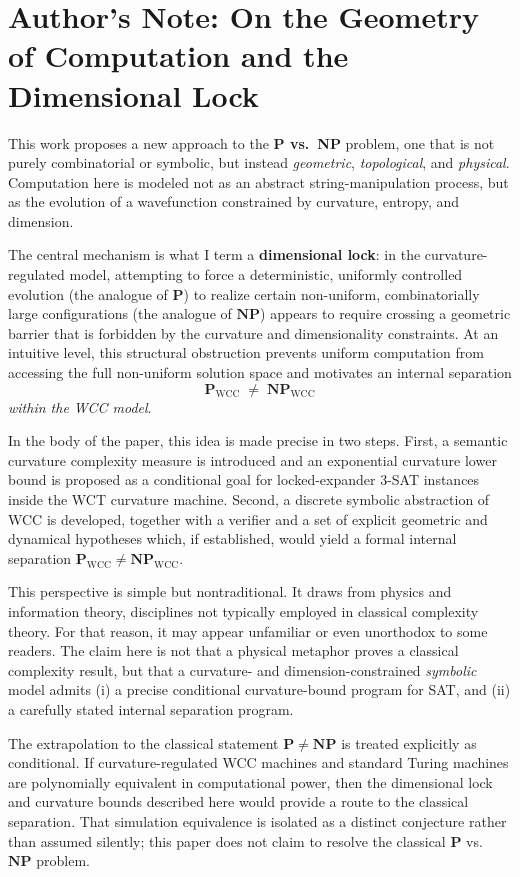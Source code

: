 \documentclass[12pt]{article}
\theoremstyle{remark}
\begin{document}
\clearpage
\section*{Author's Note: On the Geometry of Computation and the Dimensional Lock}

This work proposes a new approach to the \textbf{P vs.\ NP} problem, one that
is not purely combinatorial or symbolic, but instead \emph{geometric},
\emph{topological}, and \emph{physical}. Computation here is modeled not as an
abstract string-manipulation process, but as the evolution of a wavefunction
constrained by curvature, entropy, and dimension.

The central mechanism is what I term a \textbf{dimensional lock}: in the
curvature-regulated model, attempting to force a deterministic, uniformly
controlled evolution (the analogue of $\mathbf{P}$) to realize certain
non-uniform, combinatorially large configurations (the analogue of
$\mathbf{NP}$) appears to require crossing a geometric barrier that is
forbidden by the curvature and dimensionality constraints.
At an intuitive level, this structural obstruction prevents uniform
computation from accessing the full non-uniform solution space and motivates
an internal separation
\[
\mathbf{P}_{\mathrm{WCC}} \;\neq\; \mathbf{NP}_{\mathrm{WCC}}
\]
\emph{within the WCC model}.

In the body of the paper, this idea is made precise in two steps.
First, a semantic curvature complexity measure is introduced and an exponential
curvature lower bound is proposed as a conditional goal for locked-expander
3-SAT instances inside the WCT curvature machine. Second, a discrete symbolic
abstraction of WCC is developed, together with a verifier and a set of
explicit geometric and dynamical hypotheses which, if established, would
yield a formal internal separation $\mathbf{P}_{\mathrm{WCC}} \neq
\mathbf{NP}_{\mathrm{WCC}}$.

This perspective is simple but nontraditional. It draws from physics and
information theory, disciplines not typically employed in classical
complexity theory. For that reason, it may appear unfamiliar or even
unorthodox to some readers. The claim here is not that a physical metaphor
proves a classical complexity result, but that a curvature- and
dimension-constrained \emph{symbolic} model admits (i) a precise
conditional curvature-bound program for SAT, and (ii) a carefully stated
internal separation program.

The extrapolation to the classical statement $\mathbf{P} \neq \mathbf{NP}$ is
treated explicitly as conditional. If curvature-regulated WCC machines and
standard Turing machines are polynomially equivalent in computational power,
then the dimensional lock and curvature bounds described here would provide a
route to the classical separation. That simulation equivalence is isolated as
a distinct conjecture rather than assumed silently; this paper does not claim
to resolve the classical $\mathbf{P}$ vs.\ $\mathbf{NP}$ problem.
\end{document}
